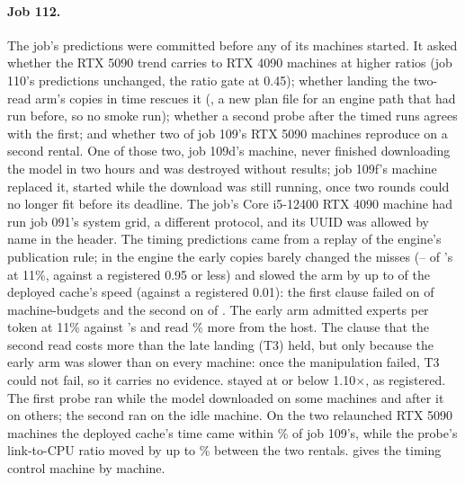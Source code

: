 \paragraph{Job 112.} The job's predictions were committed before any of its machines started. It asked whether
the RTX 5090 trend carries to RTX 4090 machines at higher ratios (job 110's predictions unchanged, the ratio gate at
0.45); whether landing the two-read arm's copies in time rescues it (\FewEarly, a new plan file for an engine path
that had run before, so no smoke run); whether a second probe after the timed runs agrees with the first; and whether
two of job 109's RTX 5090 machines reproduce on a second rental. One of those two, job 109d's machine, never finished
downloading the model in two hours and was destroyed without results; job 109f's machine replaced
it, started while the download was still running, once two rounds could no longer fit before its deadline. The job's Core i5-12400 RTX 4090 machine had run job 091's
system grid, a different protocol, and its UUID was allowed by name in the header. The
timing predictions came from a replay of the engine's publication rule; in the engine the early copies barely changed
the misses (\tcMissRatioLowMin--\tcMissRatioLowMax{} of \FewTwo's at 11\%, against a registered 0.95 or less) and
slowed the arm by up to \tcSlowLowMax{} of the deployed cache's speed (against a registered 0.01): the first clause
failed on \tcTOneFailed{} of \tcTOneN{} machine-budgets and the second on \tcTTwoFailed{} of \tcTTwoN. The early arm
admitted \tcAdmEarlyLowRng{} experts per token at 11\% against \FewTwo's \tcAdmTwoLowRng{} and read
\tcHostEarlyPctLowRng\% more from the host. The clause
that the second read costs more than the late landing (T3) held, but only because the early arm was slower than
\FewTwo{} on every machine: once the manipulation failed, T3 could not fail, so it carries no evidence. \FewEarly{} stayed
at or below 1.10$\times$, as registered. The
first probe ran while the model downloaded on some machines and after it on others; the second ran on the idle machine.
On the two relaunched RTX 5090 machines the deployed cache's time came within \tcRelaunchMax\% of job 109's, while the
probe's link-to-CPU ratio moved by up to \tcRelaunchRatioDevMax\% between the two rentals.  gives the
timing control machine by machine.





